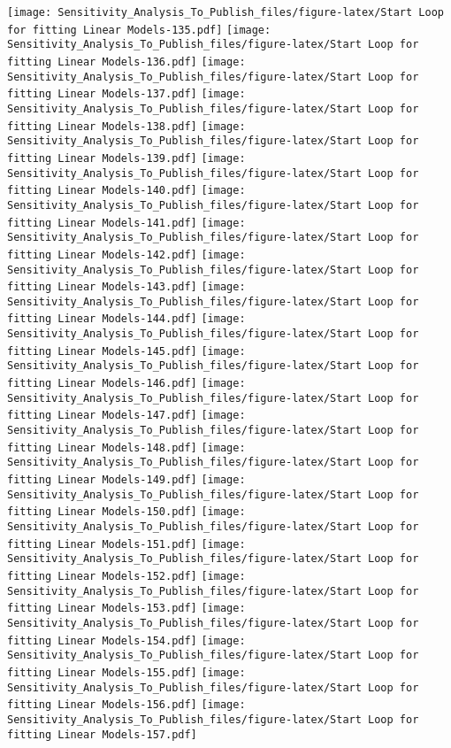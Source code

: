 \documentclass[
]{article}
\begin{document}
\texttt{[image: Sensitivity\_Analysis\_To\_Publish\_files/figure-latex/Start Loop for fitting Linear Models-135.pdf]}
\texttt{[image: Sensitivity\_Analysis\_To\_Publish\_files/figure-latex/Start Loop for fitting Linear Models-136.pdf]}
\texttt{[image: Sensitivity\_Analysis\_To\_Publish\_files/figure-latex/Start Loop for fitting Linear Models-137.pdf]}
\texttt{[image: Sensitivity\_Analysis\_To\_Publish\_files/figure-latex/Start Loop for fitting Linear Models-138.pdf]}
\texttt{[image: Sensitivity\_Analysis\_To\_Publish\_files/figure-latex/Start Loop for fitting Linear Models-139.pdf]}
\texttt{[image: Sensitivity\_Analysis\_To\_Publish\_files/figure-latex/Start Loop for fitting Linear Models-140.pdf]}
\texttt{[image: Sensitivity\_Analysis\_To\_Publish\_files/figure-latex/Start Loop for fitting Linear Models-141.pdf]}
\texttt{[image: Sensitivity\_Analysis\_To\_Publish\_files/figure-latex/Start Loop for fitting Linear Models-142.pdf]}
\texttt{[image: Sensitivity\_Analysis\_To\_Publish\_files/figure-latex/Start Loop for fitting Linear Models-143.pdf]}
\texttt{[image: Sensitivity\_Analysis\_To\_Publish\_files/figure-latex/Start Loop for fitting Linear Models-144.pdf]}
\texttt{[image: Sensitivity\_Analysis\_To\_Publish\_files/figure-latex/Start Loop for fitting Linear Models-145.pdf]}
\texttt{[image: Sensitivity\_Analysis\_To\_Publish\_files/figure-latex/Start Loop for fitting Linear Models-146.pdf]}
\texttt{[image: Sensitivity\_Analysis\_To\_Publish\_files/figure-latex/Start Loop for fitting Linear Models-147.pdf]}
\texttt{[image: Sensitivity\_Analysis\_To\_Publish\_files/figure-latex/Start Loop for fitting Linear Models-148.pdf]}
\texttt{[image: Sensitivity\_Analysis\_To\_Publish\_files/figure-latex/Start Loop for fitting Linear Models-149.pdf]}
\texttt{[image: Sensitivity\_Analysis\_To\_Publish\_files/figure-latex/Start Loop for fitting Linear Models-150.pdf]}
\texttt{[image: Sensitivity\_Analysis\_To\_Publish\_files/figure-latex/Start Loop for fitting Linear Models-151.pdf]}
\texttt{[image: Sensitivity\_Analysis\_To\_Publish\_files/figure-latex/Start Loop for fitting Linear Models-152.pdf]}
\texttt{[image: Sensitivity\_Analysis\_To\_Publish\_files/figure-latex/Start Loop for fitting Linear Models-153.pdf]}
\texttt{[image: Sensitivity\_Analysis\_To\_Publish\_files/figure-latex/Start Loop for fitting Linear Models-154.pdf]}
\texttt{[image: Sensitivity\_Analysis\_To\_Publish\_files/figure-latex/Start Loop for fitting Linear Models-155.pdf]}
\texttt{[image: Sensitivity\_Analysis\_To\_Publish\_files/figure-latex/Start Loop for fitting Linear Models-156.pdf]}
\texttt{[image: Sensitivity\_Analysis\_To\_Publish\_files/figure-latex/Start Loop for fitting Linear Models-157.pdf]}
\end{document}
